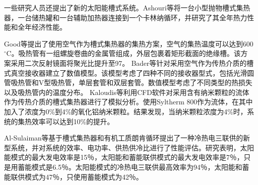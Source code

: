 一些研究人员还提出了新的太阳能槽式系统。Ashouri等\cite{Ashouri2015}将一台小型抛物槽式集热器，一台储热罐和一台辅助加热器连接到一个卡林纳循环，并研究了其全年热力性能和全年经济性能。

Good等提出了使用空气作为槽式集热器的集热方案，空气的集热温度可以达到600$\mathrm{^\circ C}$。吸热管有一组螺旋卷曲的金属管组成，外层包裹着矩形截面的绝缘槽。该方案采用二次反射镜面将聚光比提升至97。
Bader等\cite{Bader2015}针对采用空气作为传热介质的槽式真空接收器建立了数值模型。该模型考虑了四种不同的接收器型式，包括光滑圆管吸热管和V型吸热管，单层套管和双层套管。数值模型考虑了不同类型的热损失以及吸热管内的温度分布。
Kaloudis等\cite{Kaloudis2016}利用CFD软件对采用含有纳米颗粒的流体作为传热介质的槽式集热器进行了模拟分析。使用Syltherm 800作为流体，在其中加入了浓度为0\%到4\%的氧化铝纳米颗粒。结果发现，当纳米颗粒浓度为4\%时，系统的集热效率可以达到10\%的提升。

Al-Sulaiman等\cite{AlSulaiman2012}基于槽式集热器和有机工质朗肯循环提出了一种冷热电三联供的新型系统，并对系统的效率、电功率、供热供冷比进行了性能评估。研究表明，太阳能模式的最大发电效率是15％，太阳能和蓄能联供模式的最大发电效率是7％，只是用蓄能模式是6.5％。太阳能模式的冷热电三联供最高效率为94％，太阳能和蓄能联供模式为47％，只使用蓄能模式为42％。

